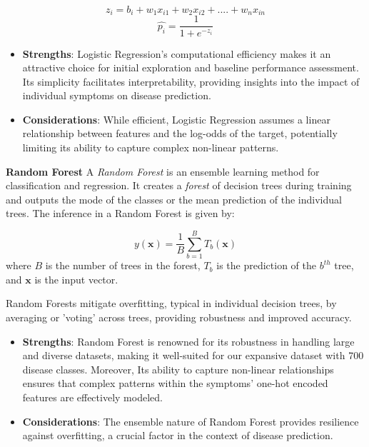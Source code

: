 \vspace{0cm}
\begin{equation} \label{eq:funct}
    z_i = b_i + w_1x_{i1} + w_2x_{i2} + .... + w_nx_{in}
\end{equation}
\vspace{0cm}
\begin{equation} \label{eq:prob}
    \hat{p_i}=\frac {1}{1+e^{-z_i}}
\end{equation}
\vspace{0cm}
\begin{itemize}
	\item \textbf{Strengths}: Logistic Regression's computational efficiency makes it an attractive choice for initial exploration and
	      baseline performance assessment. Its simplicity facilitates interpretability, providing insights into the impact of individual symptoms on disease prediction.
	\item \textbf{Considerations}: While efficient, Logistic Regression assumes a linear relationship between features and the
	      log-odds of the target, potentially limiting its ability to capture complex non-linear patterns.
\end{itemize}

\noindent
\textbf{Random Forest}\vspace{0.15cm}
A \textit{Random Forest} is an ensemble learning method for classification and regression. It creates a \textit{forest} of decision trees during training and outputs the mode of the classes or the mean prediction of the individual trees. The inference in a Random Forest is given by:

\begin{equation}
    y(\mathbf{x}) = \frac{1}{B} \sum_{b=1}^{B} T_b(\mathbf{x})
\end{equation}
\noindent
where $B$ is the number of trees in the forest, $T_b$ is the prediction of the $b^{th}$ tree, and $\mathbf{x}$ is the input vector.

Random Forests mitigate overfitting, typical in individual decision trees, by averaging or 'voting' across trees, providing robustness and improved accuracy.

\begin{itemize}
	\item \textbf{Strengths}: Random Forest is renowned for its robustness in handling large and diverse datasets, making
	      it well-suited for our expansive dataset with 700 disease classes. Moreover, Its ability to capture non-linear relationships
	      ensures that complex patterns within the symptoms' one-hot encoded features are effectively modeled.
	\item \textbf{Considerations}: The ensemble nature of Random Forest provides resilience against overfitting, a crucial factor
	      in the context of disease prediction.
\end{itemize}

